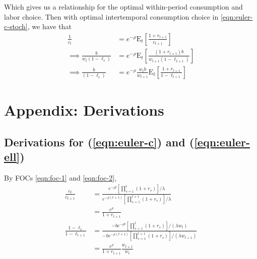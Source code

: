 \documentclass{article}
\newcommand{\Et}[1]{\mathrm{E}_t\left[#1\right]}
\begin{document}
\begin{itemize}
        Which gives us a relationship for the optimal within-period consumption and labor choice. Then with optimal intertemporal consumption choice in \eqref{eqn:euler-c-stoch}, we have that
        \begin{align}
            \frac{1}{c_t}
            &= e^{-\rho} \Et{\frac{1+r_{t+1}}{c_{t+1}}}
            \\ \implies
            \frac{b}{w_t(1 - \ell_t)}
            &= e^{-\rho} \Et{\frac{(1+r_{t+1})b}{w_{t+1} (1-\ell_{t+1})}}
            \\ \implies
            \frac{b}{(1 - \ell_t)}
            &= e^{-\rho} \frac{w_t b}{w_{t+1}}\Et{\frac{1+r_{t+1}}{1-\ell_{t+1}}}
        \end{align}
        
        \end{itemize}
    

    \appendix
    \section{Appendix: Derivations}
    
    \subsection{Derivations for (\ref{eqn:euler-c}) and (\ref{eqn:euler-ell})}\label{app:euler-c-ell}
        
        By FOCs \eqref{eqn:foc-1} and \eqref{eqn:foc-2},
        \begin{align}
            \frac{c_t}{c_{t+1}}
            &= \frac{e^{-\rho t}
                \left[\prod_{s=1}^{t}(1+r_s)\right] / \lambda}
                {e^{-\rho (t+1)} \left[\prod_{s=1}^{t+1}(1+r_s)\right] / \lambda}
            \\
            &= \frac{e^{\rho}}{1+r_{t+1}}
            \\
            \frac{1-\ell_t}{1-\ell_{t+1}}
            &= \frac{- b e^{-\rho t}
                    \left[\prod_{s=1}^{t}(1+r_s)\right] / (\lambda w_t)}
                    {- b e^{-\rho (t+1)}
                    \left[\prod_{s=1}^{t+1}(1+r_s)\right] / (\lambda w_{t+1})}
            \\
            &= \frac{e^{\rho}}{1+r_{t+1}}\frac{w_{t+1}}{w_t}
        \end{align}
    
\end{document}
